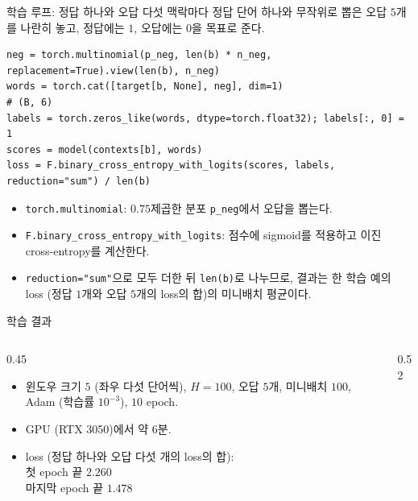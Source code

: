 \documentclass[aspectratio=169,11pt]{beamer}
\begin{document}
\begin{frame}[fragile]{학습 루프: 정답 하나와 오답 다섯}
맥락마다 정답 단어 하나와 무작위로 뽑은 오답 $5$개를 나란히 놓고, 정답에는 $1$, 오답에는 $0$을 목표로 준다.
\begin{lstlisting}
neg = torch.multinomial(p_neg, len(b) * n_neg, replacement=True).view(len(b), n_neg)
words = torch.cat([target[b, None], neg], dim=1)                       # (B, 6)
labels = torch.zeros_like(words, dtype=torch.float32); labels[:, 0] = 1
scores = model(contexts[b], words)
loss = F.binary_cross_entropy_with_logits(scores, labels, reduction="sum") / len(b)
\end{lstlisting}
\begin{itemize}
\item \texttt{torch.multinomial}: $0.75$제곱한 분포 \texttt{p\_neg}에서 오답을 뽑는다.
\item \texttt{F.binary\_cross\_entropy\_with\_logits}: 점수에 sigmoid를 적용하고 이진 cross-entropy를 계산한다.
\item \texttt{reduction="sum"}으로 모두 더한 뒤 \texttt{len(b)}로 나누므로,
결과는 한 학습 예의 loss (정답 $1$개와 오답 $5$개의 loss의 합)의 미니배치 평균이다.
\end{itemize}
\end{frame}

\begin{frame}{학습 결과}
\begin{columns}[c,onlytextwidth]
\begin{column}{0.45\textwidth}
\begin{itemize}
\item 윈도우 크기 $5$ (좌우 다섯 단어씩), $H=100$, 오답 $5$개, 미니배치 $100$, Adam (학습률 $10^{-3}$), $10$ epoch.
\item GPU (RTX 3050)에서 약 $6$분.
\item loss (정답 하나와 오답 다섯 개의 loss의 합): \\
첫 epoch 끝 $2.260$ \\
마지막 epoch 끝 $1.478$
\end{itemize}
\end{column}
\begin{column}{0.52\textwidth}
\end{column}
\end{columns}
\end{frame}
\end{document}
